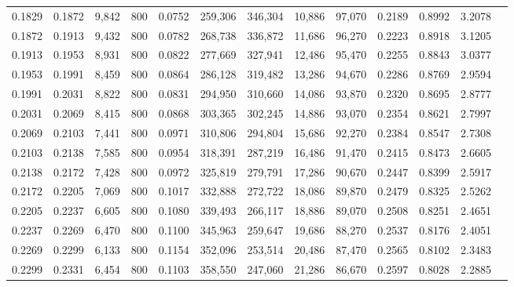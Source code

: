 \begin{tabular}{rrrrrrrrrrrrr}
0.1829 & 0.1872 &  9,842 &   800 &                                     0.0752 & 259,306 & 346,304 &  10,886 &  97,070 & 0.2189 & 0.8992 & 3.2078 \\
0.1872 & 0.1913 &  9,432 &   800 &                                     0.0782 & 268,738 & 336,872 &  11,686 &  96,270 & 0.2223 & 0.8918 & 3.1205 \\
0.1913 & 0.1953 &  8,931 &   800 &                                     0.0822 & 277,669 & 327,941 &  12,486 &  95,470 & 0.2255 & 0.8843 & 3.0377 \\
0.1953 & 0.1991 &  8,459 &   800 &                                     0.0864 & 286,128 & 319,482 &  13,286 &  94,670 & 0.2286 & 0.8769 & 2.9594 \\
0.1991 & 0.2031 &  8,822 &   800 &                                     0.0831 & 294,950 & 310,660 &  14,086 &  93,870 & 0.2320 & 0.8695 & 2.8777 \\
0.2031 & 0.2069 &  8,415 &   800 &                                     0.0868 & 303,365 & 302,245 &  14,886 &  93,070 & 0.2354 & 0.8621 & 2.7997 \\
0.2069 & 0.2103 &  7,441 &   800 &                                     0.0971 & 310,806 & 294,804 &  15,686 &  92,270 & 0.2384 & 0.8547 & 2.7308 \\
0.2103 & 0.2138 &  7,585 &   800 &                                     0.0954 & 318,391 & 287,219 &  16,486 &  91,470 & 0.2415 & 0.8473 & 2.6605 \\
0.2138 & 0.2172 &  7,428 &   800 &                                     0.0972 & 325,819 & 279,791 &  17,286 &  90,670 & 0.2447 & 0.8399 & 2.5917 \\
0.2172 & 0.2205 &  7,069 &   800 &                                     0.1017 & 332,888 & 272,722 &  18,086 &  89,870 & 0.2479 & 0.8325 & 2.5262 \\
0.2205 & 0.2237 &  6,605 &   800 &                                     0.1080 & 339,493 & 266,117 &  18,886 &  89,070 & 0.2508 & 0.8251 & 2.4651 \\
0.2237 & 0.2269 &  6,470 &   800 &                                     0.1100 & 345,963 & 259,647 &  19,686 &  88,270 & 0.2537 & 0.8176 & 2.4051 \\
0.2269 & 0.2299 &  6,133 &   800 &                                     0.1154 & 352,096 & 253,514 &  20,486 &  87,470 & 0.2565 & 0.8102 & 2.3483 \\
0.2299 & 0.2331 &  6,454 &   800 &                                     0.1103 & 358,550 & 247,060 &  21,286 &  86,670 & 0.2597 & 0.8028 & 2.2885 \\

\end{tabular}
